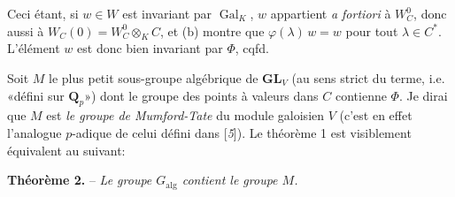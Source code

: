 Ceci étant, si $w\in W$ est invariant par $\operatorname{Gal}_K$, $w$ appartient \textit{a fortiori} à $W_C^0$, donc aussi à $W_C(0)=W_C^0\otimes_K C$, et (b) montre que $\varphi(\lambda)\,w=w$ pour tout $\lambda\in C^*$. L’élément $w$ est donc bien invariant par $\varPhi$, cqfd.

Soit $M$ le plus petit sous-groupe algébrique de $\mathbf{GL}_V$ (au sens strict du terme, i.e. «défini sur $\mathbf{Q}_p$») dont le groupe des points à valeurs dans $C$ contienne $\varPhi$. Je dirai que $M$ est \textit{le groupe de Mumford-Tate} du module galoisien $V$ (c’est en effet l’analogue $p$-adique de celui défini dans [\textit{5}]). Le théorème 1 est visiblement équivalent au suivant:

\textbf{Théorème 2.} -- \textit{Le groupe $G_{\mathrm{alg}}$ contient le groupe $M$.}
